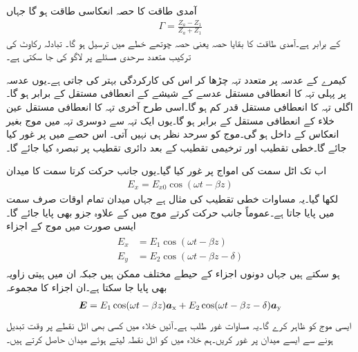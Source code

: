 آمدی طاقت کا  حصہ انعکاسی طاقت ہو گا جہاں
\begin{align}
\Gamma=\frac{Z_a-Z_1}{Z_a+Z_1}
\end{align}
کے برابر ہے۔آمدی طاقت کا بقایا حصہ یعنی  حصہ چوتھے خطے میں ترسیل ہو گا۔ تبادلہ رکاوٹ کی ترکیب متعدد سرحدی مسئلے پر لاگو کی جا سکتی ہے۔

کیمرے کے عدسہ پر متعدد تہہ چڑھا کر اس کی کارکردگی بہتر کی جاتی ہے۔یوں عدسہ پر پہلی تہہ کا انعطافی مستقل عدسے کے شیشے کے انعطافی مستقل کے برابر ہو گا۔اگلی تہہ کا انعطافی مستقل قدر کم ہو گا۔اسی طرح آخری تہہ کا انعطافی مستقل عین خلاء کے انعطافی مستقل کے برابر ہو گا۔یوں ایک تہہ سے دوسری تہہ میں موج بغیر انعکاس کے داخل ہو گی۔موج کو سرحد نظر ہی نہیں آتی۔  
اس حصے میں   پر غور کیا جائے گا۔خطی تقطیب اور ترخیمی تقطیب کے بعد دائری تقطیب پر تبصرہ کیا جائے گا۔

اب تک اٹل سمت کی امواج پر غور کیا گیا۔یوں  جانب حرکت کرتا  سمت کا میدان
\begin{align}
E_x = E_{x0} \cos (\omega t -\beta z)
\end{align}
لکھا گیا۔یہ مساوات خطی تقطیب کی مثال ہے جہاں میدان تمام اوقات صرف  سمت میں پایا جاتا ہے۔عموماً  جانب حرکت کرتے موج میں  کے علاوہ  جزو بھی پایا جائے گا۔ایسی صورت میں موج کے اجزاء
\begin{gather}
\begin{aligned}\label{مساوات_قطبیت_عمومی_اجزاء}
E_x&=E_1 \cos (\omega t -\beta z)\\
E_y&=E_2 \cos (\omega t -\beta z -\delta)
\end{aligned}
\end{gather}
ہو سکتے ہیں جہاں دونوں اجزاء کے حیطے مختلف ممکن ہیں جبکہ ان میں ہیتی زاویہ  بھی پایا جا سکتا ہے۔ان اجزاء کا مجموعہ
\begin{align}\label{مساوات_قطبیت_عمومی_مساوات}
{\ensuremath{{\boldsymbol{E}}}}=E_1 \cos (\omega t -\beta z) {\boldsymbol{a}}_{\textup{x}}+E_2 \cos (\omega t -\beta z -\delta) {\boldsymbol{a}}_{\textup{y}}
\end{align}
ایسی موج کو ظاہر کرے گا۔یہ مساوات غور طلب ہے۔آئیں خلاء میں کسی بھی اٹل نقطے پر وقت تبدیل ہونے سے  ایسے میدان پر غور کریں۔ہم خلاء میں   کو اٹل نقطہ لیتے ہوئے  میدان حاصل کرتے ہیں۔

